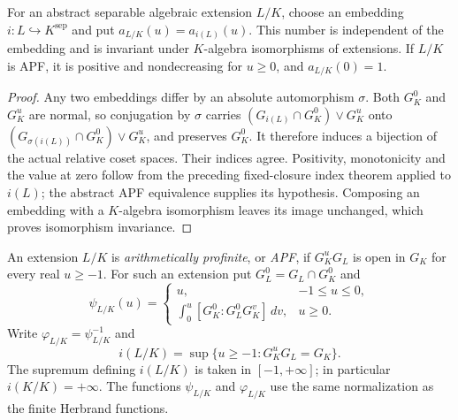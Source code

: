 \begin{lemma}
\label{fw:apf-index-embedding}
\leanok
For an abstract separable algebraic extension $L/K$, choose an embedding
$i:L\hookrightarrow K^{\mathrm{sep}}$ and put
$a_{L/K}(u)=a_{i(L)}(u)$. This number is independent of the embedding
and is invariant under $K$-algebra isomorphisms of extensions.
If $L/K$ is APF, it is positive and nondecreasing for $u\geq0$, and
$a_{L/K}(0)=1$.
\end{lemma}
\begin{proof}
Any two embeddings differ by an absolute automorphism $\sigma$. Both
$G_K^0$ and $G_K^u$ are normal, so conjugation by $\sigma$ carries
$(G_{i(L)}\cap G_K^0)\vee G_K^u$ onto
$(G_{\sigma(i(L))}\cap G_K^0)\vee G_K^u$, and preserves $G_K^0$.
It therefore induces a bijection of the actual relative coset spaces.
Their indices agree. Positivity, monotonicity and the value at zero
follow from the preceding fixed-closure index theorem applied to $i(L)$;
the abstract APF equivalence supplies its hypothesis. Composing an
embedding with a $K$-algebra isomorphism leaves its image unchanged,
which proves isomorphism invariance.
\end{proof}

\begin{definition}
\label{fw:apf}
\leanok
An extension $L/K$ is \emph{arithmetically profinite}, or \emph{APF},
if $G_K^uG_L$ is open in $G_K$ for every real $u\geq-1$.
For such an extension put $G_L^0=G_L\cap G_K^0$ and
\[
 \psi_{L/K}(u)=
 \begin{cases}
  u,&-1\leq u\leq0,\\
  \displaystyle\int_0^u [G_K^0:G_L^0G_K^v]\,dv,&u\geq0.
 \end{cases}
\]
Write $\varphi_{L/K}=\psi_{L/K}^{-1}$ and
\[
 i(L/K)=\sup\{u\geq-1:G_K^uG_L=G_K\}.
\]
The supremum defining $i(L/K)$ is taken in $[-1,+\infty]$;
in particular $i(K/K)=+\infty$. The functions $\psi_{L/K}$ and $\varphi_{L/K}$ use the same normalization
as the finite Herbrand functions.
\end{definition}

